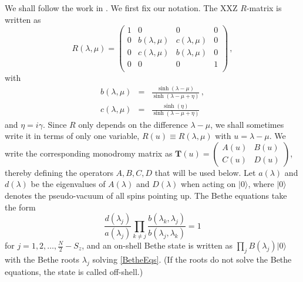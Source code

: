 \documentclass[a4paper,10pt]{article}
\newcommand{\linnea}[1]{$\framebox{\tiny L}$\ \textbf{\texttt{{\color{red}\footnotesize#1}}}}
\begin{document}
We shall follow the work in \cite{Terras}. We first fix our notation. The XXZ $R$-matrix is written as
\begin{equation}
R(\lambda,\mu)=\begin{pmatrix}
1&0&0&0\\
0&b(\lambda,\mu)&c(\lambda,\mu)&0\\
0&c(\lambda,\mu)&b(\lambda,\mu)&0\\
0&0&0&1\\
\end{pmatrix} \,,
\end{equation}
%
with
%
\begin{subequations}
\begin{eqnarray}
 b(\lambda,\mu) &=& \frac{\sinh(\lambda-\mu)}{\sinh(\lambda-\mu+\eta)} \,, \\
 c(\lambda,\mu) &=& \frac{\sinh(\eta)}{\sinh(\lambda-\mu+\eta)}
\end{eqnarray}
\end{subequations}
and $\eta=i\gamma$. Since $R$ only depends on the difference $\lambda-\mu$, we shall sometimes write it in terms of only one variable, $R(u) \equiv R(\lambda,\mu)$ with $u = \lambda-\mu$. %
%
%
We write the corresponding monodromy matrix as $\mathbf{T}(u)=\left( \begin{smallmatrix}
A(u)&B(u)\\C(u)&D(u)
\end{smallmatrix}\right)$, thereby defining the operators $A,B,C,D$ that will be used below. 
Let $a(\lambda)$ and $ d(\lambda)$ be the eigenvalues of $A(\lambda)$ and $D(\lambda)$ when acting on $|0\rangle$, where $|0\rangle$ denotes the pseudo-vacuum of all spins pointing up. The Bethe equations take the form
\begin{equation}\label{BetheEqs}
\frac{d(\lambda_j)}{a(\lambda_j)}\prod_{k\neq j}\frac{b(\lambda_k,\lambda_j)}{b(\lambda_j,\lambda_k)}=1
\end{equation}
for $j=1,2,\ldots,\frac{N}{2}-S_z$, and an on-shell Bethe state is written as $\prod_j B(\lambda_j)|0\rangle$ with the Bethe roots $\lambda_j$ solving \eqref{BetheEqs}. (If the roots do not solve the Bethe equations, the state is called off-shell.)
\end{document}

